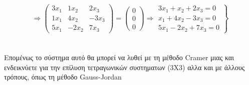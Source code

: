 \documentclass[12pt,a4paper]{article}
\begin{document}
\begin{enumerate}
\[ \Rightarrow \left( {\begin{array}{*{20}{c}}
{3{x_1}}&{1{x_2}}&{2{x_3}}\\
{1{x_1}}&{4{x_2}}&{ - 3{x_3}}\\
{5{x_1}}&{ - 2{x_2}}&{7{x_3}}
\end{array}} \right) = \left( {\begin{array}{*{20}{c}}
0\\
0\\
0
\end{array}} \right) \Rightarrow \left. {\begin{array}{*{20}{c}}
{3{x_1} + {x_2} + 2{x_3} = 0}\\
{{x_1} + 4{x_2} - 3{x_3} = 0}\\
{5{x_1} - 2{x_2} + 7{x_3} = 0}
\end{array}} \right\}\]\\\\

Επομένως το σύστημα αυτό θα μπορεί να λυθεί με τη μέθοδο \textlatin{Cramer} μιας και ενδεικνύετε για την επίλυση τετραγωνικών συστηματων (3Χ3) αλλα και με άλλους τρόπους, όπως τη μέθοδο \textlatin{Gauss-Jordan}
\end{enumerate}
\end{document}
